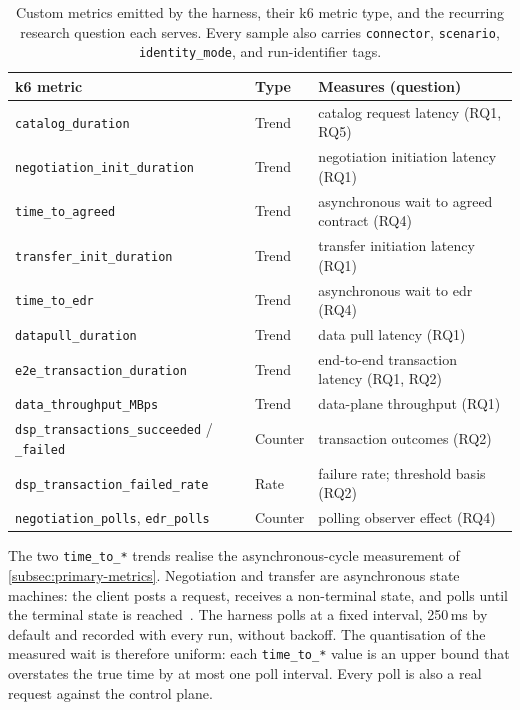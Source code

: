 \begin{table}[ht]
    \centering
    \small
    \setlength{\tabcolsep}{4pt}
    \begin{tabularx}{\textwidth}{@{}>{\raggedright\arraybackslash}p{5.65cm} l X@{}}
        \toprule
        \textbf{k6 metric} & \textbf{Type} & \textbf{Measures (question)} \\
        \midrule
        \texttt{catalog\_duration} & Trend & catalog request latency (RQ1, RQ5) \\
        \texttt{negotiation\_init\_duration} & Trend & negotiation initiation latency (RQ1) \\
        \texttt{time\_to\_agreed} & Trend & asynchronous wait to agreed contract (RQ4) \\
        \texttt{transfer\_init\_duration} & Trend & transfer initiation latency (RQ1) \\
        \texttt{time\_to\_edr} & Trend & asynchronous wait to \gls{edr} (RQ4) \\
        \texttt{datapull\_duration} & Trend & data pull latency (RQ1) \\
        \texttt{e2e\_transaction\_duration} & Trend & end-to-end transaction latency (RQ1, RQ2) \\
        \texttt{data\_throughput\_MBps} & Trend & data-plane throughput (RQ1) \\
        \texttt{dsp\_transactions\_succeeded} / \texttt{\_failed} & Counter & transaction outcomes (RQ2) \\
        \texttt{dsp\_transaction\_failed\_rate} & Rate & failure rate; threshold basis (RQ2) \\
        \texttt{negotiation\_polls}, \texttt{edr\_polls} & Counter & polling observer effect (RQ4) \\
        \bottomrule
    \end{tabularx}
    \caption[Custom k6 metrics]{Custom metrics emitted by the harness, their k6 metric type, and the recurring research question each serves. Every sample also carries \texttt{connector}, \texttt{scenario}, \texttt{identity\_mode}, and run-identifier tags.}
    \label{tab:k6-metrics}
\end{table}

The two \texttt{time\_to\_*} trends realise the asynchronous-cycle measurement of \cref{subsec:primary-metrics}. Negotiation and transfer are asynchronous state machines: the client posts a request, receives a non-terminal state, and polls until the terminal state is reached~\citep{eclipseEdcDocumentation}. The harness polls at a fixed interval, 250\,ms by default and recorded with every run, without backoff. The quantisation of the measured wait is therefore uniform: each \texttt{time\_to\_*} value is an upper bound that overstates the true time by at most one poll interval. Every poll is also a real request against the control plane.

